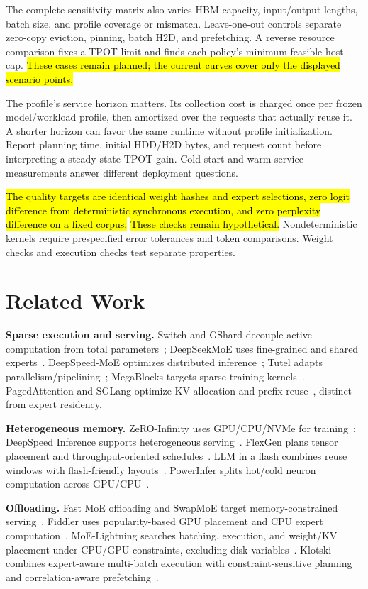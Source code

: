 \documentclass[conference,9pt,letterpaper]{IEEEtran}
\newcommand{\draftnote}[1]{{\sethlcolor{DraftYellow}\hl{#1}}}
\begin{document}
The complete sensitivity matrix also varies HBM capacity, input/output lengths, batch size, and profile coverage or mismatch. Leave-one-out controls separate zero-copy eviction, pinning, batch H2D, and prefetching. A reverse resource comparison fixes a TPOT limit and finds each policy's minimum feasible host cap. \draftnote{These cases remain planned; the current curves cover only the displayed scenario points.}

The profile's service horizon matters. Its collection cost is charged once per frozen model/workload profile, then amortized over the requests that actually reuse it. A shorter horizon can favor the same runtime without profile initialization. Report planning time, initial HDD/H2D bytes, and request count before interpreting a steady-state TPOT gain. Cold-start and warm-service measurements answer different deployment questions.

\draftnote{The quality targets are identical weight hashes and expert selections, zero logit difference from deterministic synchronous execution, and zero perplexity difference on a fixed corpus.} \draftnote{These checks remain hypothetical.} Nondeterministic kernels require prespecified error tolerances and token comparisons. Weight checks and execution checks test separate properties.

\section{Related Work}
\label{sec:related}
\textbf{Sparse execution and serving.} Switch and GShard decouple active computation from total parameters~\cite{switch,gshard}; DeepSeekMoE uses fine-grained and shared experts~\cite{deepseekmoe}. DeepSpeed-MoE optimizes distributed inference~\cite{deepspeedmoe}; Tutel adapts parallelism/pipelining~\cite{tutel}; MegaBlocks targets sparse training kernels~\cite{megablocks}. PagedAttention and SGLang optimize KV allocation and prefix reuse~\cite{pagedattention,sglang}, distinct from expert residency.

\textbf{Heterogeneous memory.} ZeRO-Infinity uses GPU/CPU/NVMe for training~\cite{zeroinfinity}; DeepSpeed Inference supports heterogeneous serving~\cite{dsinference}. FlexGen plans tensor placement and throughput-oriented schedules~\cite{flexgen}. LLM in a flash combines reuse windows with flash-friendly layouts~\cite{llmflash}. PowerInfer splits hot/cold neuron computation across GPU/CPU~\cite{powerinfer}.

\textbf{Offloading.} Fast MoE offloading and SwapMoE target memory-constrained serving~\cite{offloading,swapmoe}. Fiddler uses popularity-based GPU placement and CPU expert computation~\cite{fiddler}. MoE-Lightning searches batching, execution, and weight/KV placement under CPU/GPU constraints, excluding disk variables~\cite{lightning}. Klotski combines expert-aware multi-batch execution with constraint-sensitive planning and correlation-aware prefetching~\cite{klotski}.
\end{document}
